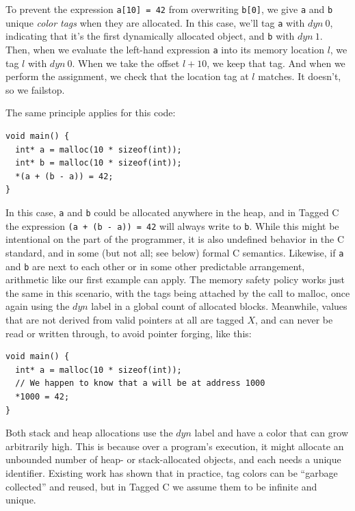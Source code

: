 \documentclass[acmsmall,review,anonymous]{acmart}\settopmatter{printfolios=true,printccs=false,printacmref=false}
\begin{document}
To prevent the expression {\tt a[10] = 42} from overwriting {\tt b[0]}, we give {\tt a} and {\tt b}
unique {\it color tags} when they are allocated. In this case, we'll tag {\tt a} with \(\mathit{dyn ~ 0}\),
indicating that it's the first dynamically allocated object, and {\tt b} with \(\mathit{dyn ~ 1}\).
Then, when we evaluate the left-hand expression {\tt a} into its memory location \(l\), we tag
\(l\) with \(\mathit{dyn ~ 0}\). When we take the offset \(l + 10\), we keep that tag. And when we
perform the assignment, we check that the location tag at \(l\) matches. It doesn't, so we failstop.

The same principle applies for this code:

\vspace{\abovedisplayskip}
\begin{verbatim}
void main() {
  int* a = malloc(10 * sizeof(int));
  int* b = malloc(10 * sizeof(int));
  *(a + (b - a)) = 42;
}
\end{verbatim}
\vspace{\belowdisplayskip}

In this case, {\tt a} and {\tt b} could be allocated anywhere in the heap, and in Tagged C
the expression {\tt *(a + (b - a)) = 42} will always write to {\tt *b}. While this might be intentional
on the part of the programmer, it is also undefined behavior in the C standard, and in some
(but not all; see below) formal C semantics. Likewise, if {\tt a} and {\tt b} are next to each other
or in some other predictable arrangement, arithmetic like our first example can apply.
The memory safety policy works just the same in this scenario, with the tags being attached
by the call to malloc, once again using the \(\mathit{dyn}\) label in a global count of allocated blocks.
Meanwhile, values that are not derived from valid pointers at all are tagged \(X\), and can never
be read or written through, to avoid pointer forging, like this:

\vspace{\abovedisplayskip}
\begin{verbatim}
void main() {
  int* a = malloc(10 * sizeof(int));
  // We happen to know that a will be at address 1000
  *1000 = 42;
}
\end{verbatim}
\vspace{\belowdisplayskip}

Both stack and heap allocations use the \(\mathit{dyn}\) label and have a color that can grow arbitrarily
high. This is because over a program's execution, it might allocate an unbounded number of heap- or
stack-allocated objects, and each needs a unique identifier. Existing work has shown that in practice,
tag colors can be ``garbage collected'' and reused, but in Tagged C we assume them to be infinite and unique.
\end{document}
